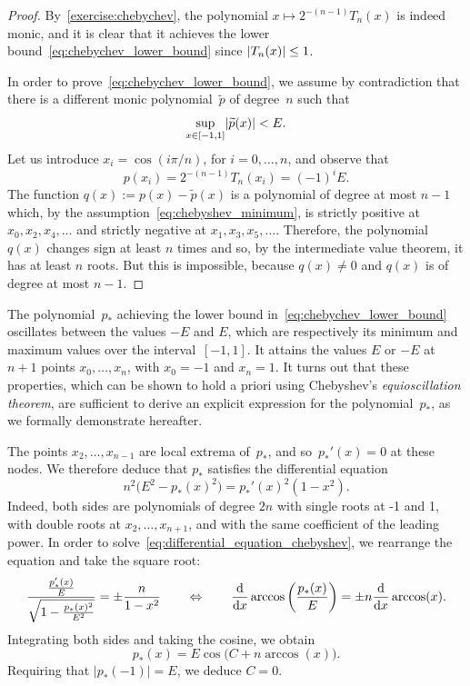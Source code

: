 \begin{proof}
    By~\cref{exercise:chebychev},
    the polynomial $x \mapsto 2^{-(n-1)} T_n(x)$ is indeed monic,
    and it is clear that it achieves the lower bound~\eqref{eq:chebychev_lower_bound}
    since $\lvert T_n(x)\rvert \leq 1$.

    In order to prove~\eqref{eq:chebychev_lower_bound},
    we assume by contradiction that there is a different monic polynomial~$\widetilde p$ of degree~$n$ such that
    \begin{equation}
        \label{eq:chebyshev_minimum}
        \sup_{x \in [-1, 1]} \lvert\widetilde p(x)\rvert < E.
    \end{equation}
    Let us introduce $x_i = \cos(i \pi/n)$, for $i = 0, \dotsc, n$,
    and observe that
    \[
        p(x_i) = 2^{-(n-1)} T_n(x_i) = (-1)^i E.
    \]
    The function $q(x) := p(x) - \widetilde p(x)$ is a polynomial of degree at most $n-1$ which,
    by the assumption~\eqref{eq:chebyshev_minimum},
    is strictly positive at $x_0, x_2, x_4, \dotsc$ and strictly negative at $x_1, x_3, x_5, \dotsc$.
    Therefore, the polynomial $q(x)$ changes sign at least $n$ times and so,
    by the intermediate value theorem, it has at least $n$ roots.
    But this is impossible, because $q(x) \neq 0$ and $q(x)$ is of degree at most $n-1$.
\end{proof}
\begin{remark}
    \label{remark:cheb}
    The polynomial~$p_*$ achieving the lower bound in~\eqref{eq:chebychev_lower_bound}
    oscillates between the values $-E$ and $E$,
    which are respectively its minimum and maximum values over the interval~$[-1, 1]$.
    It attains the values $E$ or $-E$ at $n+1$ points $x_0, \dotsc, x_n$,
    with $x_0 = -1$ and $x_n = 1$.
    It turns out that these properties,
    which can be shown to hold a priori using Chebyshev's \emph{equioscillation theorem},
    are sufficient to derive an explicit expression for the polynomial~$p_*$,
    as we formally demonstrate hereafter.

    The points $x_2, \dotsc, x_{n-1}$
    are local extrema of~$p_*$,
    and so~$p_*'(x) = 0$ at these nodes.
    We therefore deduce that $p_*$ satisfies the differential equation
    \begin{equation}
        \label{eq:differential_equation_chebyshev}
        n^2\bigl(E^2 - p_*(x)^2\bigr) = p_*'(x)^2 (1 - x^2).
    \end{equation}
    Indeed, both sides are polynomials of degree $2n$ with single roots at -1 and 1,
    with double roots at $x_2, \dotsc, x_{n+1}$,
    and with the same coefficient of the leading power.
    In order to solve~\eqref{eq:differential_equation_chebyshev},
    we rearrange the equation and take the square root:
    \[
        \frac{\frac{p_*'(x)}{E}}{\sqrt{1 - \frac{p_*(x)^2}{E^2}}} = \pm \frac{n}{1 - x^2}
        \qquad \Leftrightarrow \qquad
        \frac{\mathrm d}{\mathrm d x} \arccos\left(\frac{p_*(x)}{E}\right) = \pm n \frac{\mathrm d}{\mathrm d x} \arccos(x).
    \]
    Integrating both sides and taking the cosine,
    we obtain
    \[
        p_*(x) = E \cos\bigl(C + n \arccos(x)\bigr).
    \]
    Requiring that $|p_*(-1)| = E$, we deduce $C = 0$.
\end{remark}

